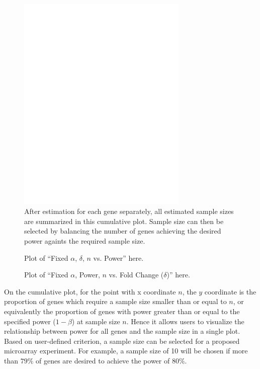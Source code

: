 \documentclass{bioinfo}
\begin{document}
\begin{figure}[h]
  \centerline{\includegraphics*[width=3.2in]{CumPlot.pdf}}
  \caption[Effect of Sample Size on Power]
  {After estimation for each gene separately, all estimated sample
    sizes are summarized in this cumulative plot. Sample size can then
    be selected by balancing the number of genes achieving the desired
    power againts the required sample size.}
  \label{fig:CumNPlot}
\end{figure}

\begin{figure}[h]
  \caption[Given Sample Size, Fraction of Genes Achieving a Specified Power]
  {Plot of ``Fixed $\alpha$, $\delta$, $n$ vs. Power'' here.}
  \label{fig:CumPowerPlot}
\end{figure}

\begin{figure}[h]
  \caption[Given Sample Size, Fold Change (Effect Size) Necessary to Achieving a Specified Power]
  {Plot of ``Fixed $\alpha$, Power, $n$ vs. Fold Change ($\delta$)'' here.}
  \label{fig:CumFoldChangePlot}
\end{figure}

On the cumulative plot, for the point with x coordinate $n$, the $y$
coordinate is the proportion of genes which require a sample size
smaller than or equal to $n$, or equivalently the
proportion of genes with power greater than or equal to the
specified power ($1-\beta$) at sample size $n$. Hence it allows
users to visualize the relationship between power for all genes and
the sample size in a single plot. Based on user-defined criterion, a
sample size can be selected for a proposed microarray experiment.
For example, a sample size of 10 will be chosen if more than $79\%$
of genes are desired to achieve the power of $80\%$.
\end{document}

